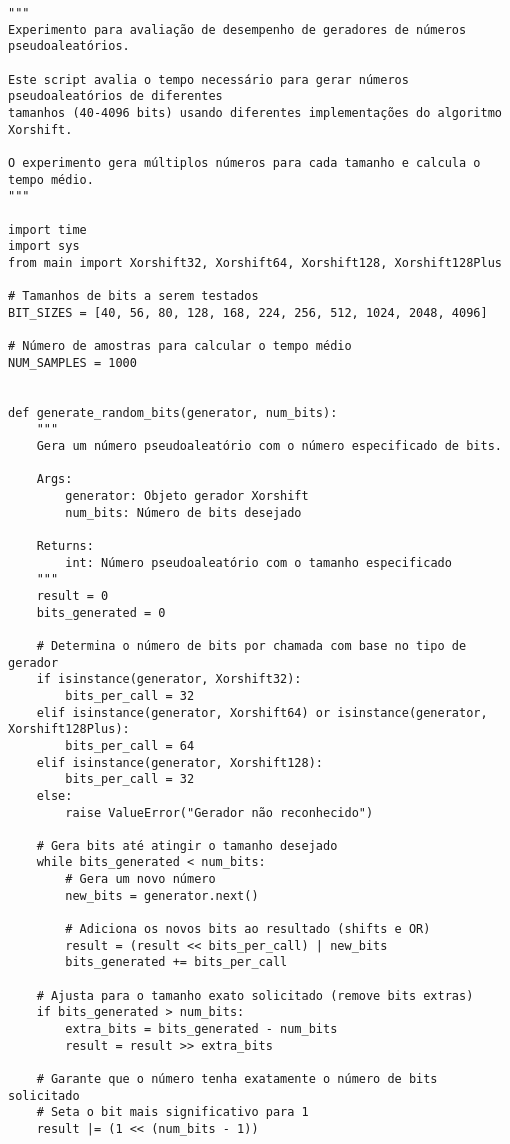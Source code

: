 \begin{verbatim}
"""
Experimento para avaliação de desempenho de geradores de números pseudoaleatórios.

Este script avalia o tempo necessário para gerar números pseudoaleatórios de diferentes
tamanhos (40-4096 bits) usando diferentes implementações do algoritmo Xorshift.

O experimento gera múltiplos números para cada tamanho e calcula o tempo médio.
"""

import time
import sys
from main import Xorshift32, Xorshift64, Xorshift128, Xorshift128Plus

# Tamanhos de bits a serem testados
BIT_SIZES = [40, 56, 80, 128, 168, 224, 256, 512, 1024, 2048, 4096]

# Número de amostras para calcular o tempo médio
NUM_SAMPLES = 1000


def generate_random_bits(generator, num_bits):
    """
    Gera um número pseudoaleatório com o número especificado de bits.
    
    Args:
        generator: Objeto gerador Xorshift
        num_bits: Número de bits desejado
    
    Returns:
        int: Número pseudoaleatório com o tamanho especificado
    """
    result = 0
    bits_generated = 0
    
    # Determina o número de bits por chamada com base no tipo de gerador
    if isinstance(generator, Xorshift32):
        bits_per_call = 32
    elif isinstance(generator, Xorshift64) or isinstance(generator, Xorshift128Plus):
        bits_per_call = 64
    elif isinstance(generator, Xorshift128):
        bits_per_call = 32
    else:
        raise ValueError("Gerador não reconhecido")
    
    # Gera bits até atingir o tamanho desejado
    while bits_generated < num_bits:
        # Gera um novo número
        new_bits = generator.next()
        
        # Adiciona os novos bits ao resultado (shifts e OR)
        result = (result << bits_per_call) | new_bits
        bits_generated += bits_per_call
    
    # Ajusta para o tamanho exato solicitado (remove bits extras)
    if bits_generated > num_bits:
        extra_bits = bits_generated - num_bits
        result = result >> extra_bits
        
    # Garante que o número tenha exatamente o número de bits solicitado
    # Seta o bit mais significativo para 1
    result |= (1 << (num_bits - 1))
    

\end{verbatim}
